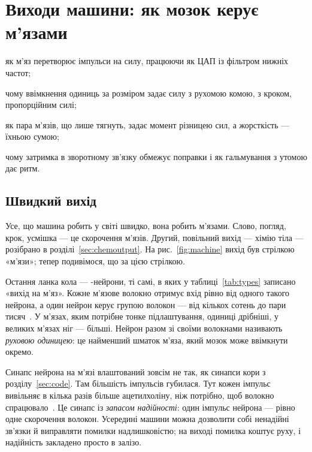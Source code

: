 \chapter{Виходи машини: як мозок керує м'язами}
\label{sec:muscles}
\begin{chaptergoals}
\item як м'яз перетворює імпульси на силу, працюючи як ЦАП із фільтром нижніх частот;
\item чому ввімкнення одиниць за розміром задає силу з рухомою комою, з кроком, пропорційним силі;
\item як пара м'язів, що лише тягнуть, задає момент різницею сил, а жорсткість --- їхньою сумою;
\item чому затримка в зворотному зв'язку обмежує поправки і як гальмування з утомою дає ритм.
\end{chaptergoals}

\section{Швидкий вихід}

Усе, що машина робить у світі швидко, вона робить м'язами. Слово, погляд, крок, усмішка --- це скорочення м'язів. Другий, повільний вихід --- хімію тіла --- розібрано в розділі~\ref{sec:chemoutput}. На рис.~\ref{fig:machine} вихід був стрілкою «м'язи»; тепер подивімося, що за цією стрілкою.

Остання ланка кола --- -нейрони, ті самі, в яких у таблиці~\ref{tab:types} записано «вихід на м'яз». Кожне м'язове волокно отримує вхід рівно від одного такого нейрона, а один нейрон керує групою волокон --- від кількох сотень до пари тисяч~\cite{Feinstein1955mu}. У м'язах, яким потрібне тонке підлаштування, одиниці дрібніші, у великих м'язах ніг --- більші. Нейрон разом зі своїми волокнами називають \emph{руховою одиницею}: це найменший шматок м'яза, який мозок може ввімкнути окремо.

Синапс нейрона на м'язі влаштований зовсім не так, як синапси кори з розділу~\ref{sec:code}. Там більшість імпульсів губилася. Тут кожен імпульс вивільняє в кілька разів більше ацетилхоліну, ніж потрібно, щоб волокно спрацювало~\cite{WoodSlater2001}. Це синапс із \emph{запасом надійності}: один імпульс нейрона --- рівно одне скорочення волокон. Усередині машини можна дозволити собі ненадійні зв'язки й виправляти помилки надлишковістю; на виході помилка коштує руху, і надійність закладено просто в залізо.

